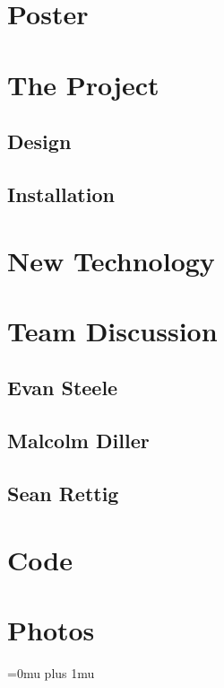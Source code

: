 \documentclass[10pt,draftclsnofoot,onecolumn]{IEEEtran}
\begin{document}
\section{Poster}
\section{The Project}
\subsection{Design}

\subsection{Installation}

\section{New Technology}

\section{Team Discussion}
\subsection{Evan Steele}
\subsection{Malcolm Diller}
\subsection{Sean Rettig}
\section{Code}
\section{Photos}
\Urlmuskip=0mu plus 1mu\relax


\end{document}

